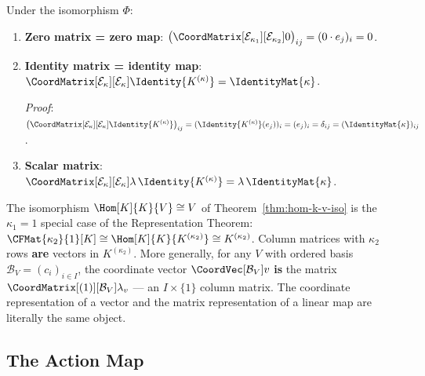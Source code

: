 \begin{corollary}
\label{cor:special-matrices}
    Under the isomorphism $\Phi$:
    \begin{enumerate}
        \item \textbf{Zero matrix = zero map}:
              $\bigl(\CoordMatrix[\mathcal{E}_{\kappa_1}][\mathcal{E}_{\kappa_2}]{0}\bigr)_{ij}
              = (0 \cdot e_j)_i = 0$.
        \item \textbf{Identity matrix = identity map}:
              $\CoordMatrix[\mathcal{E}_\kappa][\mathcal{E}_\kappa]{
              \Identity{K^{(\kappa)}}} = \IdentityMat{\kappa}$.

              \textit{Proof}: $\bigl(\CoordMatrix[\mathcal{E}_\kappa][\mathcal{E}_\kappa]{
              \Identity{K^{(\kappa)}}}\bigr)_{ij}
              = (\Identity{K^{(\kappa)}}(e_j))_i = (e_j)_i = \delta_{ij}
              = (\IdentityMat{\kappa})_{ij}$.
        \item \textbf{Scalar matrix}:
              $\CoordMatrix[\mathcal{E}_\kappa][\mathcal{E}_\kappa]{
              \lambda\, \Identity{K^{(\kappa)}}}
              = \lambda\, \IdentityMat{\kappa}$.
    \end{enumerate}
\end{corollary}

\begin{remark}
\label{rem:vec-as-hom}
    The isomorphism $\Hom[K]{K}{V} \cong V$ of Theorem~\ref{thm:hom-k-v-iso} is the
    $\kappa_1 = 1$ special case of the Representation Theorem:
    $\CFMat{\kappa_2}{1}[K] \cong \Hom[K]{K}{K^{(\kappa_2)}} \cong K^{(\kappa_2)}$.
    Column matrices with $\kappa_2$ rows \textbf{are} vectors in $K^{(\kappa_2)}$.
    More generally, for any $V$ with ordered basis
    $\mathcal{B}_V = (c_i)_{i \in I}$, the coordinate vector
    $\CoordVec[\mathcal{B}_V]{v}$ \textbf{is} the matrix
    $\CoordMatrix[(1)][\mathcal{B}_V]{\lambda_v}$ --- an $I \times \{1\}$ column matrix.
    The coordinate representation of a vector and the matrix representation of a linear
    map are literally the same object.
\end{remark}


\subsection{The Action Map}

